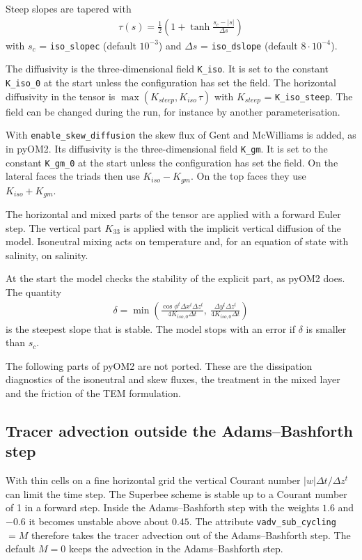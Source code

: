 \documentclass[12pt]{article}
\newcommand{\beq}  { \begin{eqnarray} }
\newcommand{\eeq}  { \end{eqnarray}}
\newcommand{\beeq}  { \begin{eqnarray*} }
\newcommand{\eeeq}  { \end{eqnarray*}}
\newcommand{\lk}{\left(}
\newcommand{\rk}{\right)}
\begin{document}
Steep slopes are tapered with
\beq
 \tau(s) = \frac{1}{2} \lk 1 + \tanh \frac{s_c - |s|}{\Delta s} \rk
\eeq
with $s_c$ = \verb|iso_slopec| (default $10^{-3}$) and $\Delta s$ = \verb|iso_dslope| (default $8 \cdot 10^{-4}$).

The diffusivity is the three-dimensional field \verb|K_iso|.
It is set to the constant \verb|K_iso_0| at the start unless the configuration has set the field.
The horizontal diffusivity in the tensor is $\max(K_{steep}, K_{iso}\, \tau)$ with $K_{steep}$ = \verb|K_iso_steep|.
The field can be changed during the run, for instance by another parameterisation.

With \verb|enable_skew_diffusion| the skew flux of Gent and McWilliams is added, as in pyOM2.
Its diffusivity is the three-dimensional field \verb|K_gm|.
It is set to the constant \verb|K_gm_0| at the start unless the configuration has set the field.
On the lateral faces the triads then use $K_{iso} - K_{gm}$.
On the top faces they use $K_{iso} + K_{gm}$.

The horizontal and mixed parts of the tensor are applied with a forward Euler step.
The vertical part $K_{33}$ is applied with the implicit vertical diffusion of the model.
Isoneutral mixing acts on temperature and, for an equation of state with salinity, on salinity.

At the start the model checks the stability of the explicit part, as pyOM2 does.
The quantity
\beeq
 \delta = \min \lk \frac{\cos \phi^t \Delta x^t \Delta z^t}{4 K_{iso,0} \Delta t},\ \frac{\Delta y^t \Delta z^t}{4 K_{iso,0} \Delta t} \rk
\eeeq
is the steepest slope that is stable.
The model stops with an error if $\delta$ is smaller than $s_c$.

The following parts of pyOM2 are not ported.
These are the dissipation diagnostics of the isoneutral and skew fluxes, the treatment in the mixed layer and the friction of the TEM formulation.

\subsection*{Tracer advection outside the Adams--Bashforth step}

With thin cells on a fine horizontal grid the vertical Courant number $|w| \Delta t/\Delta z^t$ can limit the time step.
The Superbee scheme is stable up to a Courant number of 1 in a forward step.
Inside the Adams--Bashforth step with the weights $1.6$ and $-0.6$ it becomes unstable above about $0.45$.
The attribute \verb|vadv_sub_cycling| $= M$ therefore takes the tracer advection out of the Adams--Bashforth step.
The default $M = 0$ keeps the advection in the Adams--Bashforth step.
\end{document}
